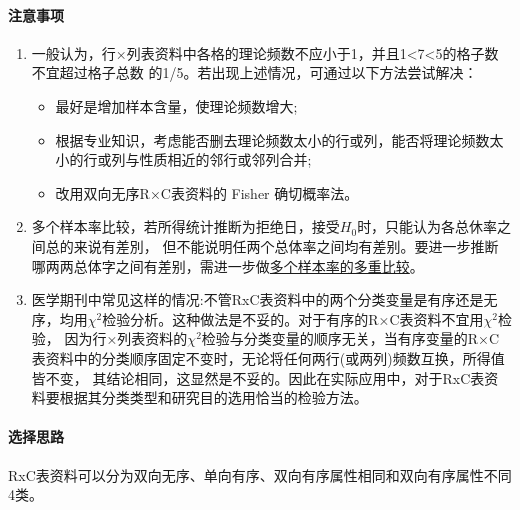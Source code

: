 \documentclass[
]{article}
\providecommand{\tightlist}{%
  \setlength{\itemsep}{0pt}\setlength{\parskip}{0pt}}
\begin{document}
\hypertarget{ux6ce8ux610fux4e8bux9879}{%
\paragraph{注意事项}\label{ux6ce8ux610fux4e8bux9879}}

\begin{enumerate}
\def\labelenumi{\arabic{enumi}.}
\item
  一般认为，行×列表资料中各格的理论频数不应小于1，并且1\textless7\textless5的格子数不宜超过格子总数 的1/5。若出现上述情况，可通过以下方法尝试解决：

  \begin{itemize}
  \tightlist
  \item
    最好是增加样本含量，使理论频数增大;
  \item
    根据专业知识，考虑能否删去理论频数太小的行或列，能否将理论频数太小的行或列与性质相近的邻行或邻列合并;
  \item
    改用双向无序R×C表资料的 Fisher 确切概率法。
  \end{itemize}
\item
  多个样本率比较，若所得统计推断为拒绝日，接受\(H_0\)时，只能认为各总休率之间总的来说有差別，
  但不能说明任两个总体率之间均有差别。要进一步推断哪两两总体字之间有差别，需进一步做\protect\hyperlink{ux591aux4e2aux6837ux672cux7387ux7684ux591aux91cdux6bd4ux8f83}{多个样本率的多重比较}。
\item
  医学期刊中常见这样的情况:不管RxC表资料中的两个分类变量是有序还是无序，均用\(\chi^2\)检验分析。这种做法是不妥的。对于有序的R×C表资料不宜用\(\chi^2\)检验，
  因为行×列表资料的\(\chi^2\)检验与分类变量的顺序无关，当有序变量的R×C表资料中的分类顺序固定不变时，无论将任何两行(或两列)频数互换，所得值皆不变，
  其结论相同，这显然是不妥的。因此在实际应用中，对于RxC表资料要根据其分类类型和研究目的选用恰当的检验方法。
\end{enumerate}

\hypertarget{ux9009ux62e9ux601dux8def}{%
\paragraph{选择思路}\label{ux9009ux62e9ux601dux8def}}

RxC表资料可以分为双向无序、单向有序、双向有序属性相同和双向有序属性不同4类。
\end{document}
